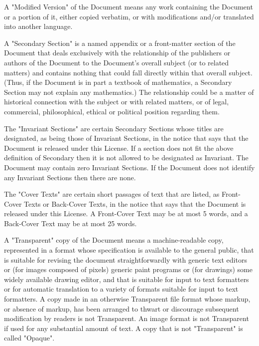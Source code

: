 \begin{multicols}{2}
{\footnotesize A "Modified Version" of the Document means any work containing the Document or a portion of it, either copied verbatim, or with modifications and/or translated into another language.}{\footnotesize \par}

{\footnotesize A "Secondary Section" is a named appendix or a front-matter section of the Document that deals exclusively with the relationship of the publishers or authors of the Document to the Document's overall subject (or to related matters) and contains nothing that could fall directly within that overall subject. (Thus, if the Document is in part a textbook of mathematics, a Secondary Section may not explain any mathematics.) The relationship could be a matter of historical connection with the subject or with related matters, or of legal, commercial, philosophical, ethical or political position regarding them.}{\footnotesize \par}

{\footnotesize The "Invariant Sections" are certain Secondary Sections whose titles are designated, as being those of Invariant Sections, in the notice that says that the Document is released under this License. If a section does not fit the above definition of Secondary then it is not allowed to be designated as Invariant. The Document may contain zero Invariant Sections. If the Document does not identify any Invariant Sections then there are none.}{\footnotesize \par}

{\footnotesize The "Cover Texts" are certain short passages of text that are listed, as Front-Cover Texts or Back-Cover Texts, in the notice that says that the Document is released under this License. A Front-Cover Text may be at most 5 words, and a Back-Cover Text may be at most 25 words.}{\footnotesize \par}

{\footnotesize A "Transparent" copy of the Document means a machine-readable copy, represented in a format whose specification is available to the general public, that is suitable for revising the document straightforwardly with generic text editors or (for images composed of pixels) generic paint programs or (for drawings) some widely available drawing editor, and that is suitable for input to text formatters or for automatic translation to a variety of formats suitable for input to text formatters. A copy made in an otherwise Transparent file format whose markup, or absence of markup, has been arranged to thwart or discourage subsequent modification by readers is not Transparent. An image format is not Transparent if used for any substantial amount of text. A copy that is not "Transparent"
is called "Opaque".}{\footnotesize \par}


\end{multicols}
